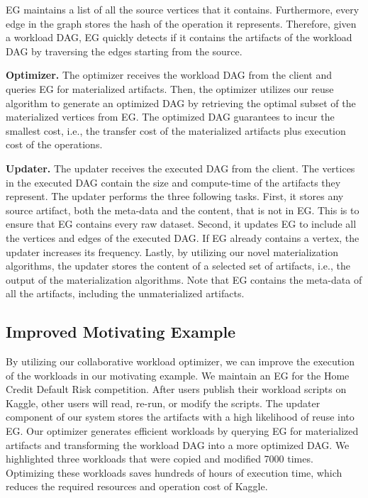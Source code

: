 EG maintains a list of all the source vertices that it contains.
Furthermore, every edge in the graph stores the hash of the operation it represents.
Therefore, given a workload DAG, EG quickly detects if it contains the artifacts of the workload DAG by traversing the edges starting from the source.

\textbf{Optimizer. }
The optimizer receives the workload DAG from the client and queries EG for materialized artifacts.
Then, the optimizer utilizes our reuse algorithm to generate an optimized DAG by retrieving the optimal subset of the materialized vertices from EG.
The optimized DAG guarantees to incur the smallest cost, i.e., the transfer cost of the materialized artifacts plus execution cost of the operations.

\textbf{Updater.}
The updater receives the executed DAG from the client.
The vertices in the executed DAG contain the size and compute-time of the artifacts they represent.
The updater performs the three following tasks.
First, it stores any source artifact, both the meta-data and the content, that is not in EG.
This is to ensure that EG contains every raw dataset.
Second, it updates EG to include all the vertices and edges of the executed DAG.
If EG already contains a vertex, the updater increases its frequency.
Lastly, by utilizing our novel materialization algorithms, the updater stores the content of a selected set of artifacts, i.e., the output of the materialization algorithms.
Note that EG contains the meta-data of all the artifacts, including the unmaterialized artifacts.
\subsection{Improved Motivating Example}
By utilizing our collaborative workload optimizer, we can improve the execution of the workloads in our motivating example.
We maintain an EG for the Home Credit Default Risk competition.
After users publish their workload scripts on Kaggle, other users will read, re-run, or modify the scripts.
The updater component of our system stores the artifacts with a high likelihood of reuse into EG.
Our optimizer generates efficient workloads by querying EG for materialized artifacts and transforming the workload DAG into a more optimized DAG.
We highlighted three workloads that were copied and modified 7000 times.
Optimizing these workloads saves hundreds of hours of execution time, which reduces the required resources and operation cost of Kaggle.